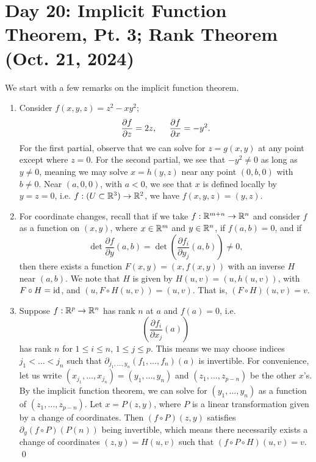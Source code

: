 \section{Day 20: Implicit Function Theorem, Pt. 3; Rank Theorem (Oct. 21, 2024)}
We start with a few remarks on the implicit function theorem.
\begin{enumerate}[label=(\alph*)]
    \item Consider $f(x, y, z) = z^2 - xy^2$;
    \[ \frac{\partial f}{\partial z} = 2z, \hspace{0.2in} \frac{\partial f}{\partial x} = -y^2. \]
    For the first partial, observe that we can solve for $z = g(x, y)$ at any point except where $z = 0$. For the second partial, we see that $-y^2 \neq 0$ as long as $y \neq 0$, meaning we may solve $x = h(y, z)$ near any point $(0, b, 0)$ with $b \neq 0$. Near $(a, 0, 0)$, with $a < 0$, we see that $x$ is defined locally by $y = z = 0$, i.e. $f : (U \subset \mathbb R^3) \to \mathbb R^2$, we have $f(x, y, z) = (y, z)$.
    \item For coordinate changes, recall that if we take $f : \mathbb R^{m + n} \to \mathbb R^n$ and consider $f$ as a function on $(x, y)$, where $x \in \mathbb R^m$ and $y \in \mathbb R^n$, if $f(a, b) = 0$, and if
    \[ \det \frac{\partial f}{\partial y}(a, b) = \det \left( \frac{\partial f_i}{\partial y_j} (a, b) \right) \neq 0, \]
    then there exists a function $F(x, y) = (x, f(x, y))$ with an inverse $H$ near $(a, b)$. We note that $H$ is given by $H(u, v) = (u, h(u, v))$, with $F \circ H = \mathrm{id}$, and $(u, F \circ H(u, v)) = (u, v)$. That is, $(F \circ H)(u, v) = v$.
    \item Suppose $f : \mathbb R^p \to \mathbb R^n$ has rank $n$ at $a$ and $f(a) = 0$, i.e.
    \[ \left(\frac{\partial f_i}{\partial x_j}(a)\right) \]
    has rank $n$ for $1 \leq i \leq n$, $1 \leq j \leq p$. This means we may choose indices $j_1 < \dots < j_n$ such that $\partial_{j_1, \dots, y_n} (f_1, \dots, f_n)(a)$ is invertible. For convenience, let us write $(x_{j_1}, \dots, x_{j_n}) = (y_1, \dots, y_n)$ and $(z_1, \dots, z_{p-n})$ be the other $x$'s. By the implicit function theorem, we can solve for $(y_1, \dots, y_n)$ as a function of $(z_1, \dots, z_{p-n})$. Let $x = P(z, y)$, where $P$ is a linear transformation given by a change of coordinates. Then $(f \circ P)(z, y)$ satisfies $\partial_y (f \circ P) (P(n))$ being invertible, which means there necessarily exists a change of coordinates $(z, y) = H(u, v)$ such that $(f \circ P \circ H)(u, v) = v$. \qed
\end{enumerate}
